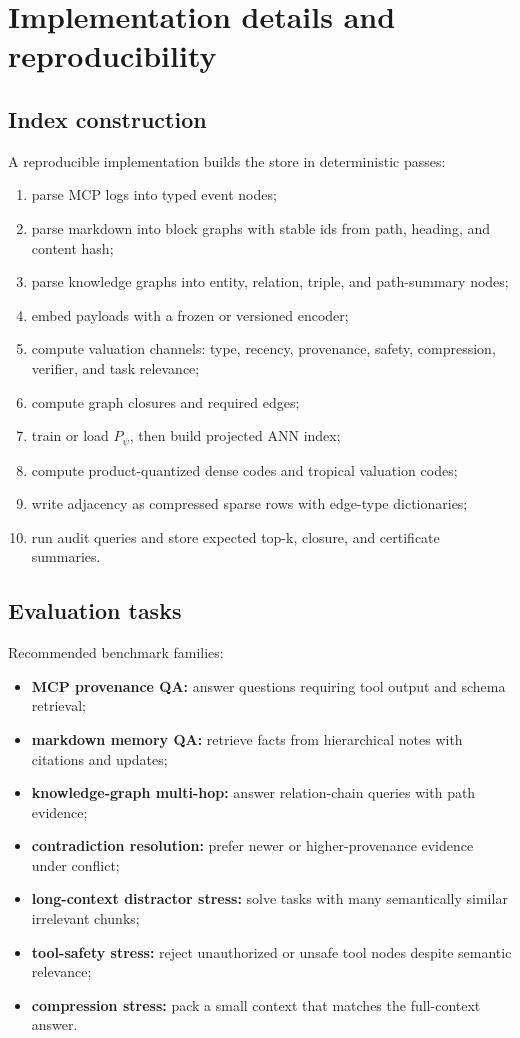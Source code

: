 \documentclass[11pt]{article}
\theoremstyle{definition}
\theoremstyle{remark}
\begin{document}
\section{Implementation details and reproducibility}

\subsection{Index construction}

A reproducible implementation builds the store in deterministic passes:
\begin{enumerate}
    \item parse MCP logs into typed event nodes;
    \item parse markdown into block graphs with stable ids from path, heading, and content hash;
    \item parse knowledge graphs into entity, relation, triple, and path-summary nodes;
    \item embed payloads with a frozen or versioned encoder;
    \item compute valuation channels: type, recency, provenance, safety, compression, verifier, and task relevance;
    \item compute graph closures and required edges;
    \item train or load \(P_\psi\), then build projected ANN index;
    \item compute product-quantized dense codes and tropical valuation codes;
    \item write adjacency as compressed sparse rows with edge-type dictionaries;
    \item run audit queries and store expected top-k, closure, and certificate summaries.
\end{enumerate}

\subsection{Evaluation tasks}

Recommended benchmark families:
\begin{itemize}
    \item \textbf{MCP provenance QA:} answer questions requiring tool output and schema retrieval;
    \item \textbf{markdown memory QA:} retrieve facts from hierarchical notes with citations and updates;
    \item \textbf{knowledge-graph multi-hop:} answer relation-chain queries with path evidence;
    \item \textbf{contradiction resolution:} prefer newer or higher-provenance evidence under conflict;
    \item \textbf{long-context distractor stress:} solve tasks with many semantically similar irrelevant chunks;
    \item \textbf{tool-safety stress:} reject unauthorized or unsafe tool nodes despite semantic relevance;
    \item \textbf{compression stress:} pack a small context that matches the full-context answer.
\end{itemize}
\end{document}
